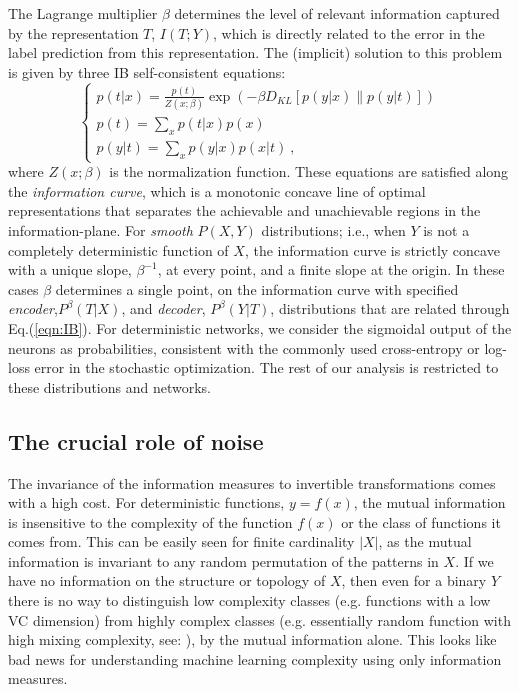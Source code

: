 \documentclass[11pt]{article}
\newcommand\mycomment[1]{} 			     %
\begin{document}
The Lagrange multiplier $\beta$ determines the level of relevant information captured by the representation $T$, $I(T;Y)$, which is directly related to the error in the label prediction from this representation.  The (implicit) solution to this problem is given by three IB self-consistent equations:
\begin{equation}
\label{eqn:IB}
\begin{cases}
p\left(t|x\right)=\frac{p\left(t\right)}{Z\left(x;\beta\right)}\exp\left(-\beta D_{KL}\left[p\left(y|x\right)\parallel p\left(y|t\right)\right]\right)\\
p\left(t\right)=\sum_{x}p\left(t|x\right)p\left(x\right)\\
p\left(y|t\right)=\sum_{x}p\left(y|x\right)p\left(x|t\right)~,
\end{cases}
\end{equation}
where $Z\left(x;\beta\right)$ is the normalization function. 
These equations are satisfied along the \emph{information curve}, which is a monotonic concave line of optimal representations that separates the achievable and unachievable regions in the information-plane. For \emph{smooth} $P(X,Y)$ distributions; i.e., when $Y$ is not a completely deterministic function of $X$, 
the information curve is strictly concave with a unique slope, $\beta^{-1}$, at every point, and a finite slope at the origin. 
In these cases $\beta$ determines a single point,  
on the information curve with specified \emph{encoder},$P^{\beta}(T|X)$, and \emph{decoder},  $P^{\beta}(Y|T)$, distributions that are related through Eq.(\ref{eqn:IB}).  
For deterministic networks, we consider the sigmoidal output of the neurons as probabilities, consistent with the commonly used cross-entropy or log-loss error in the  stochastic optimization.  
The rest of our analysis is restricted to these distributions and networks.


\subsection{The crucial role of noise}
The invariance of the information measures to invertible transformations comes with a high cost. 
For deterministic functions, $y=f(x)$, the mutual information is insensitive to the complexity of the function $f(x)$ or the class of functions it comes from. This can be easily seen for finite cardinality $|X|$, as the mutual information is invariant to any random permutation of the patterns in $X$. If we have no information on the structure or topology of $X$, then even for a binary $Y$ there is no way to distinguish low complexity classes (e.g. functions with a low VC dimension) from highly complex classes (e.g. essentially random function with high mixing complexity, see: \citet{MoshkovichTishby17}), by the mutual information alone. This looks like bad news for understanding machine learning complexity using only information measures. 
\end{document}
